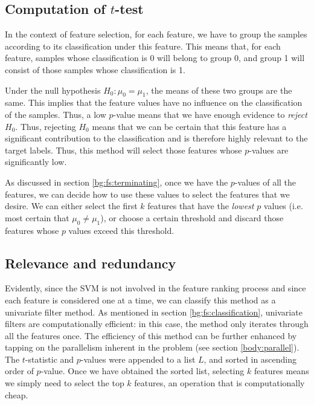 \documentclass[12pt, twoside, a4paper]{report}
\begin{document}
\subsection{Computation of $t$-test}
In the context of feature selection, for each feature, we have to group the samples according to its classification under this feature. This means that, for each feature, samples whose classification is 0 will belong to group 0, and group 1 will consist of those samples whose classification is 1.

Under the null hypothesis $H_0: \mu_0 = \mu_1$, the means of these two groups are the same. This implies that the feature values have no influence on the classification of the samples. Thus, a low $p$-value means that we have enough evidence to \textit{reject} $H_0$. Thus, rejecting $H_0$ means that we can be certain that this feature has a significant contribution to the classification and is therefore highly relevant to the target labels. Thus, this method will select those features whose $p$-values are significantly low.

As discussed in section \ref{bg:fs:terminating}, once we have the $p$-values of all the features, we can decide how to use these values to select the features that we desire. We can either select the first $k$ features that have the \textit{lowest} $p$ values (i.e. most certain that $\mu_0 \neq \mu_1$), or choose a certain threshold and discard those features whose $p$ values exceed this threshold.

\subsection{Relevance and redundancy} \label{t_test:redundancy}

Evidently, since the SVM is not involved in the feature ranking process and since each feature is considered one at a time, we can classify this method as a univariate filter method. As mentioned in section \ref{bg:fs:classification}, univariate filters are computationally efficient: in this case, the method only iterates through all the features once. The efficiency of this method can be further enhanced by tapping on the parallelism inherent in the problem (see section \ref{body:parallel}). The $t$-statistic and $p$-values were appended to a list $L$, and sorted in ascending order of $p$-value. Once we have obtained the sorted list, selecting $k$ features means we simply need to select the top $k$ features, an operation that is computationally cheap.
\end{document}
